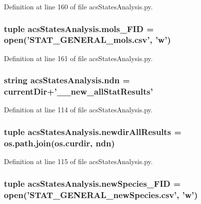 Definition at line 160 of file acs\-States\-Analysis.\-py.

\hypertarget{a00104_a603a41889d8732146d44da83ffaf0489}{
\subsubsection[{mols\-\_\-\-F\-I\-D}]{\setlength{\rightskip}{0pt plus 5cm}tuple acs\-States\-Analysis.\-mols\-\_\-\-F\-I\-D = open('S\-T\-A\-T\-\_\-\-G\-E\-N\-E\-R\-A\-L\-\_\-mols.\-csv', 'w')}}\label{a00104_a603a41889d8732146d44da83ffaf0489}


Definition at line 161 of file acs\-States\-Analysis.\-py.

\hypertarget{a00104_a5e117df6e0cdffdae13947622c6c4890}{
\subsubsection[{ndn}]{\setlength{\rightskip}{0pt plus 5cm}string acs\-States\-Analysis.\-ndn = {\bf current\-Dir}+'\-\_\-\_\-new\-\_\-all\-Stat\-Results'}}\label{a00104_a5e117df6e0cdffdae13947622c6c4890}


Definition at line 114 of file acs\-States\-Analysis.\-py.

\hypertarget{a00104_a62d6cfd52b4428ab7ea4d75d43b2d49b}{
\subsubsection[{newdir\-All\-Results}]{\setlength{\rightskip}{0pt plus 5cm}tuple acs\-States\-Analysis.\-newdir\-All\-Results = os.\-path.\-join(os.\-curdir, {\bf ndn})}}\label{a00104_a62d6cfd52b4428ab7ea4d75d43b2d49b}


Definition at line 115 of file acs\-States\-Analysis.\-py.

\hypertarget{a00104_abdb6e583333cc08cac8c63631db80b5b}{
\subsubsection[{new\-Species\-\_\-\-F\-I\-D}]{\setlength{\rightskip}{0pt plus 5cm}tuple acs\-States\-Analysis.\-new\-Species\-\_\-\-F\-I\-D = open('S\-T\-A\-T\-\_\-\-G\-E\-N\-E\-R\-A\-L\-\_\-new\-Species.\-csv', 'w')}}\label{a00104_abdb6e583333cc08cac8c63631db80b5b}


